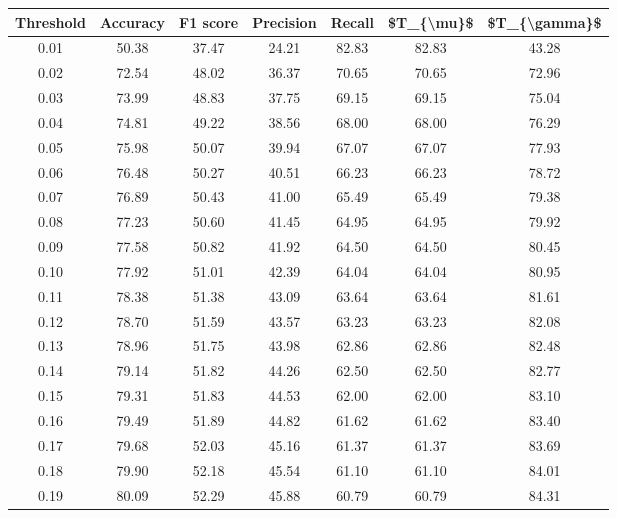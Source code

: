 \begin{tabular}{|c|c|c|c|c|c|c|}
\hline
 Threshold &  Accuracy &  F1 score &  Precision &  Recall &  \$T\_\{\textbackslash mu\}\$ &  \$T\_\{\textbackslash gamma\}\$ \\
\hline
      0.01 &     50.38 &     37.47 &      24.21 &   82.83 &      82.83 &         43.28 \\
      0.02 &     72.54 &     48.02 &      36.37 &   70.65 &      70.65 &         72.96 \\
      0.03 &     73.99 &     48.83 &      37.75 &   69.15 &      69.15 &         75.04 \\
      0.04 &     74.81 &     49.22 &      38.56 &   68.00 &      68.00 &         76.29 \\
      0.05 &     75.98 &     50.07 &      39.94 &   67.07 &      67.07 &         77.93 \\
      0.06 &     76.48 &     50.27 &      40.51 &   66.23 &      66.23 &         78.72 \\
      0.07 &     76.89 &     50.43 &      41.00 &   65.49 &      65.49 &         79.38 \\
      0.08 &     77.23 &     50.60 &      41.45 &   64.95 &      64.95 &         79.92 \\
      0.09 &     77.58 &     50.82 &      41.92 &   64.50 &      64.50 &         80.45 \\
      0.10 &     77.92 &     51.01 &      42.39 &   64.04 &      64.04 &         80.95 \\
      0.11 &     78.38 &     51.38 &      43.09 &   63.64 &      63.64 &         81.61 \\
      0.12 &     78.70 &     51.59 &      43.57 &   63.23 &      63.23 &         82.08 \\
      0.13 &     78.96 &     51.75 &      43.98 &   62.86 &      62.86 &         82.48 \\
      0.14 &     79.14 &     51.82 &      44.26 &   62.50 &      62.50 &         82.77 \\
      0.15 &     79.31 &     51.83 &      44.53 &   62.00 &      62.00 &         83.10 \\
      0.16 &     79.49 &     51.89 &      44.82 &   61.62 &      61.62 &         83.40 \\
      0.17 &     79.68 &     52.03 &      45.16 &   61.37 &      61.37 &         83.69 \\
      0.18 &     79.90 &     52.18 &      45.54 &   61.10 &      61.10 &         84.01 \\
      0.19 &     80.09 &     52.29 &      45.88 &   60.79 &      60.79 &         84.31 \\

\end{tabular}
